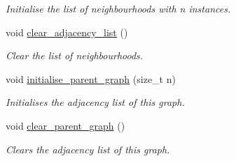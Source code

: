 \begin{DoxyCompactItemize}
\begin{DoxyCompactList}\small\item\em Initialise the list of neighbourhoods with {\itshape n} instances. \end{DoxyCompactList}\item 
void \hyperlink{classlgraph_1_1utils_1_1xxgraph_a6523402d0ec66918b95de23d2bee38fc}{clear\+\_\+adjacency\+\_\+list} ()\hypertarget{classlgraph_1_1utils_1_1xxgraph_a6523402d0ec66918b95de23d2bee38fc}{}\label{classlgraph_1_1utils_1_1xxgraph_a6523402d0ec66918b95de23d2bee38fc}

\begin{DoxyCompactList}\small\item\em Clear the list of neighbourhoods. \end{DoxyCompactList}\item 
void \hyperlink{classlgraph_1_1utils_1_1xxgraph_abd983125be7f2f2b9c812326a4a39e6d}{initialise\+\_\+parent\+\_\+graph} (size\+\_\+t n)
\begin{DoxyCompactList}\small\item\em Initialises the adjacency list of this graph. \end{DoxyCompactList}\item 
void \hyperlink{classlgraph_1_1utils_1_1xxgraph_a8d213a8dfe716d344dd51d1bd37c0e2c}{clear\+\_\+parent\+\_\+graph} ()
\begin{DoxyCompactList}\small\item\em Clears the adjacency list of this graph. \end{DoxyCompactList}\end{DoxyCompactItemize}
